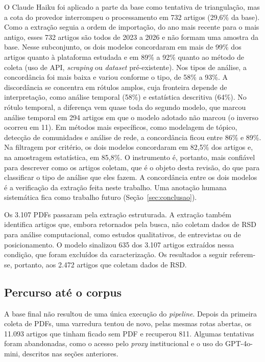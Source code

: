 \documentclass[11pt,a4paper]{article}
\begin{document}
O Claude Haiku foi aplicado a parte da base como tentativa de triangulação, mas
a cota do provedor interrompeu o processamento em 732 artigos (29,6\% da base).
Como a extração seguia a ordem de importação, do ano mais recente para o mais
antigo, esses 732 artigos são todos de 2023 a 2026 e não formam uma amostra da
base. Nesse subconjunto, os dois modelos concordaram em mais de 99\% dos
artigos quanto à plataforma estudada e em 89\% a 92\% quanto ao método de
coleta (uso de API, \textit{scraping} ou \textit{dataset} pré-existente). Nos
tipos de análise, a concordância foi mais baixa e variou conforme o tipo, de
58\% a 93\%. A discordância se concentra em rótulos amplos, cuja fronteira
depende de interpretação, como análise temporal (58\%) e estatística descritiva
(64\%). No rótulo temporal, a diferença vem quase toda do segundo modelo,
que marcou análise temporal em 294 artigos em que o modelo adotado não marcou
(o inverso ocorreu em 11). Em métodos mais específicos, como modelagem
de tópico, detecção de comunidades e análise de rede, a concordância ficou
entre 86\% e 89\%. Na filtragem por critério, os dois modelos concordaram em 82,5\% dos artigos e, na amostragem estatística, em 85,8\%. O instrumento é, portanto,
mais confiável para descrever como os artigos coletam, que é o objeto desta
revisão, do que para classificar o tipo de análise que eles fazem. A
concordância entre os dois modelos é a verificação da extração feita neste trabalho. Uma anotação humana sistemática fica como trabalho futuro
(Seção~\ref{sec:conclusao}).

Os 3.107 PDFs passaram pela extração estruturada. A extração também identifica artigos que, embora retornados pela
busca, não coletam dados de RSD para análise computacional, como estudos
qualitativos, de entrevistas ou de posicionamento. O modelo sinalizou 635 dos
3.107 artigos extraídos nessa condição, que foram excluídos da caracterização. Os
resultados a seguir referem-se, portanto, aos 2.472 artigos que coletam dados
de RSD.

\subsection{Percurso até o corpus}
\label{sec:trajetoria}
A base final não resultou de uma única execução do \textit{pipeline}. Depois da
primeira coleta de PDFs, uma varredura tentou de novo, pelas mesmas rotas
abertas, os 11.093 artigos que tinham ficado sem PDF e recuperou 811. Algumas
tentativas foram abandonadas, como o acesso pelo \textit{proxy} institucional e o
uso do GPT-4o-mini, descritos nas seções anteriores.
\end{document}
